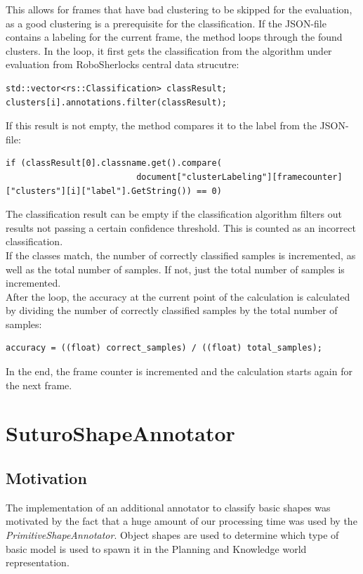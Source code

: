 \documentclass[main.tex]{subfiles}
\begin{document}
This allows for frames that have bad clustering to be skipped for the evaluation, as a good clustering is a prerequisite for the classification. If the JSON-file contains a labeling for the current frame, the method loops through the found clusters. In the loop, it first gets the classification from the algorithm under evaluation from RoboSherlocks central data strucutre:

\begin{lstlisting}
std::vector<rs::Classification> classResult;
clusters[i].annotations.filter(classResult);
\end{lstlisting}

If this result is not empty, the method compares it to the label from the JSON-file:

\begin{lstlisting}
if (classResult[0].classname.get().compare(
                          document["clusterLabeling"][framecounter]["clusters"][i]["label"].GetString()) == 0)
\end{lstlisting}

The classification result can be empty if the classification algorithm filters out results not passing a certain confidence threshold. This is counted as an incorrect classification.\\

If the classes match, the number of correctly classified samples is incremented, as well as the total number of samples. If not, just the total number of samples is incremented.\\

After the loop, the accuracy at the current point of the calculation is calculated by dividing the number of correctly classified samples by the total number of samples:

\begin{lstlisting}
accuracy = ((float) correct_samples) / ((float) total_samples);
\end{lstlisting}

In the end, the frame counter is incremented and the calculation starts again for the next frame.

\section{SuturoShapeAnnotator}

\subsection{Motivation}
The implementation of an additional annotator to classify basic shapes was motivated by the fact that a huge amount of our processing time
was used by the \textit{PrimitiveShapeAnnotator}. Object shapes are used to determine which type of basic model is used to spawn it in the Planning and Knowledge world representation.
\end{document}

